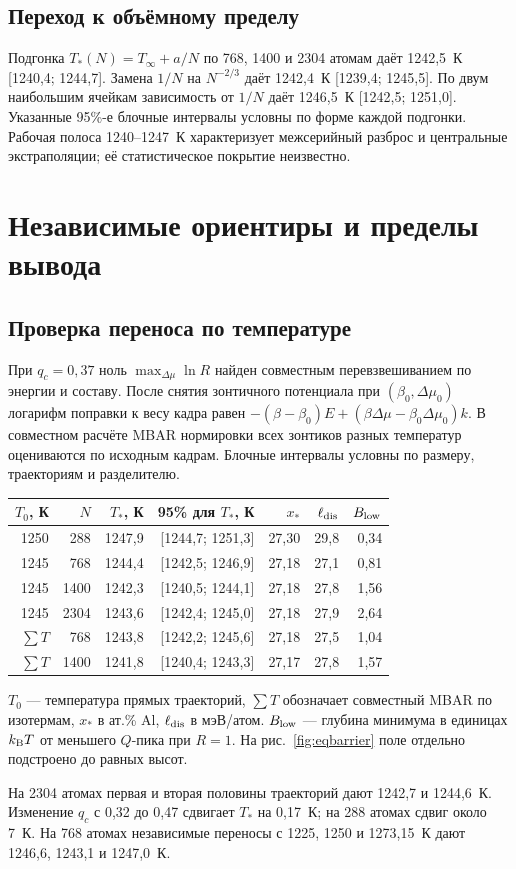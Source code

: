\documentclass[11pt,a4paper]{article}
\begin{document}
\subsection*{Переход к объёмному пределу}
Подгонка \(T_*(N)=T_\infty+a/N\) по 768, 1400 и 2304 атомам даёт 1242,5~К [1240,4; 1244,7]. Замена \(1/N\) на \(N^{-2/3}\) даёт 1242,4~К [1239,4; 1245,5]. По двум наибольшим ячейкам зависимость от \(1/N\) даёт 1246,5~К [1242,5; 1251,0]. Указанные 95\%-е блочные интервалы условны по форме каждой подгонки. Рабочая полоса 1240--1247~К характеризует межсерийный разброс и центральные экстраполяции; её статистическое покрытие неизвестно.
\clearpage
\section*{Независимые ориентиры и пределы вывода}
\subsection*{Проверка переноса по температуре}
При \(q_c=0{,}37\) ноль \(\max_{\Delta\mu}\ln R\) найден совместным перевзвешиванием по энергии и составу. После снятия зонтичного потенциала при \((\beta_0,\Delta\mu_0)\) логарифм поправки к весу кадра равен \(-(\beta-\beta_0)E+(\beta\Delta\mu-\beta_0\Delta\mu_0)k\). В совместном расчёте MBAR нормировки всех зонтиков разных температур оцениваются по исходным кадрам. Блочные интервалы условны по размеру, траекториям и разделителю.
\begin{center}\small\setlength{\tabcolsep}{3.6pt}\begin{tabular}{@{}rrrrrrr@{}}\toprule
\(T_0\), К & \(N\) & \(T_*\), К & 95\% для \(T_*\), К & \(x_*\) & \(\ell_{\rm dis}\) & \(B_{\rm low}\)\\\midrule
1250 & 288 & 1247,9 & [1244,7; 1251,3] & 27,30 & 29,8 & 0,34\\
1245 & 768 & 1244,4 & [1242,5; 1246,9] & 27,18 & 27,1 & 0,81\\
1245 & 1400 & 1242,3 & [1240,5; 1244,1] & 27,18 & 27,8 & 1,56\\
1245 & 2304 & 1243,6 & [1242,4; 1245,0] & 27,18 & 27,9 & 2,64\\
\(\sum T\) & 768 & 1243,8 & [1242,2; 1245,6] & 27,18 & 27,5 & 1,04\\
\(\sum T\) & 1400 & 1241,8 & [1240,4; 1243,3] & 27,17 & 27,8 & 1,57\\
\bottomrule\end{tabular}\end{center}
{\small \(T_0\) --- температура прямых траекторий, \(\sum T\) обозначает совместный MBAR по изотермам, \(x_*\) в ат.\% Al, \(\ell_{\rm dis}\) в мэВ/атом. \(B_{\rm low}\) --- глубина минимума в единицах \(k_{\rm B}T\) от меньшего \(Q\)-пика при \(R=1\). На рис.~\ref{fig:eqbarrier} поле отдельно подстроено до равных высот.}\par
На 2304 атомах первая и вторая половины траекторий дают 1242,7 и 1244,6~К. Изменение \(q_c\) с 0,32 до 0,47 сдвигает \(T_*\) на 0,17~К; на 288 атомах сдвиг около 7~К. На 768 атомах независимые переносы с 1225, 1250 и 1273,15~К дают 1246,6, 1243,1 и 1247,0~К.
\end{document}
